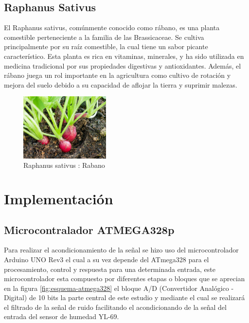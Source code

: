 \documentclass[conference]{IEEEtran}
\begin{document}
	\subsection{Raphanus Sativus}
	El Raphanus sativus, comúnmente conocido como rábano, es una planta comestible perteneciente a la familia de las Brassicaceae. Se cultiva principalmente por su raíz comestible, la cual tiene un sabor picante característico. Esta planta es rica en vitaminas, minerales, y ha sido utilizada en medicina tradicional por sus propiedades digestivas y antioxidantes. Además, el rábano juega un rol importante en la agricultura como cultivo de rotación y mejora del suelo debido a su capacidad de aflojar la tierra y suprimir malezas.
	
	\begin{figure}[h]
		\centering
		\includegraphics[width=0.4\textwidth]{media/raphanos.jpg}
		\caption{Raphanus sativus : Rabano}
		\label{fig:raphanus-sativus}
	\end{figure}
	
	
	\section{Implementación}
	
	\subsection{Microcontralador ATMEGA328p}
	Para realizar el acondicionamiento de la señal se hizo uso del microcontrolador Arduino UNO Rev3 el cual a su vez depende del ATmega328 para el procesamiento, control y respuesta para una determinada entrada, este microcontrolador esta compuesto por diferentes etapas o bloques que se aprecian en la figura \ref{fig:esquema-atmega328} el bloque A/D (Convertidor Analógico - Digital) de 10 bits la parte central de este estudio y mediante el cual se realizará el filtrado de la señal de ruido facilitando el acondicionando de la señal del entrada del sensor de humedad YL-69.
	
\end{document}
